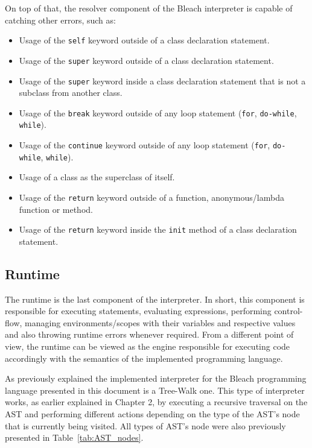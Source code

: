 On top of that, the resolver component of the Bleach interpreter is capable of catching other errors, such as:
\begin{itemize}
    \item Usage of the \texttt{self} keyword outside of a class declaration statement.
    \item Usage of the \texttt{super} keyword outside of a class declaration statement.
    \item Usage of the \texttt{super} keyword inside a class declaration statement that is not a subclass from another class.
    \item Usage of the \texttt{break} keyword outside of any loop statement (\texttt{for}, \texttt{do-while}, \texttt{while}).
    \item Usage of the \texttt{continue} keyword outside of any loop statement (\texttt{for}, \texttt{do-while}, \texttt{while}).
    \item Usage of a class as the superclass of itself.
    \item Usage of the \texttt{return} keyword outside of a function, anonymous/lambda function or method.
    \item Usage of the \texttt{return} keyword inside the \texttt{init} method of a class declaration statement.
\end{itemize}

\subsection{Runtime}
The runtime is the last component of the interpreter. In short, this component is responsible for executing statements, evaluating expressions, performing control-flow, managing environments/scopes with their variables and respective values and also throwing runtime errors whenever required. From a different point of view, the runtime can be viewed as the engine responsible for executing code accordingly with the semantics of the implemented programming language.

As previously explained the implemented interpreter for the Bleach programming language presented in this document is a Tree-Walk one. This type of interpreter works, as earlier explained in Chapter 2, by executing a recursive traversal on the AST and performing different actions depending on the type of the AST's node that is currently being visited. All types of AST's node were also previously presented in Table~\ref{tab:AST_nodes}.

